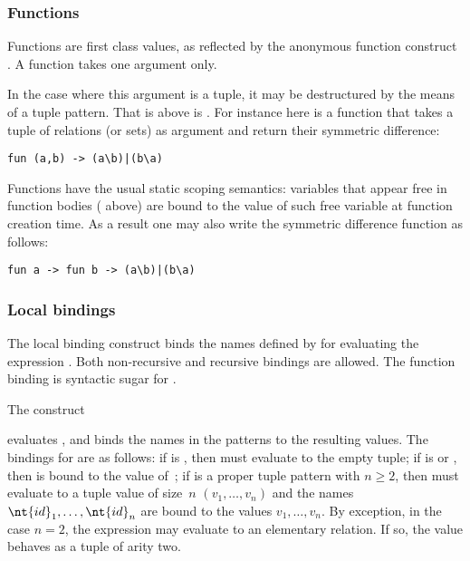 \subsubsection*{Functions}
Functions are first class values, as reflected by the anonymous
function construct .
A function takes one argument only.

In the case where this argument is a tuple, it may be destructured
by the means of a tuple pattern. That is 
above is .
For instance here is a function that takes a tuple of
relations (or sets) as argument and return their symmetric difference:
\begin{verbatim}
fun (a,b) -> (a\b)|(b\a)
\end{verbatim}

Functions have the usual static scoping semantics:
variables that appear free in function bodies
( above) are bound to
the value of such free variable at function creation time.
As a result one may also write the symmetric difference function
as follows:
\begin{verbatim}
fun a -> fun b -> (a\b)|(b\a)
\end{verbatim}

\subsubsection*{\label{bindings}Local bindings}
The local binding construct
binds the names defined by 
for evaluating the expression .
Both non-recursive and recursive bindings are allowed.
The function binding
 is syntactic sugar
for .

The construct
\begin{center}
  
\end{center}
evaluates ,
and binds the names in the patterns
 to the resulting values.
The bindings for  are as follows:
if  is \T{(}\T{)}, then  must evaluate to the empty
tuple;
if  is  or ,
then  is bound to the value of~;
if  is a proper tuple pattern
 with $n \geq 2$,
then  must evaluate to a tuple value of size~$n$
$(v_1,\ldots,v_n)$ and the names $\nt{id}_1,\ldots,\nt{id}_n$ are
bound to the values  $v_1,\ldots,v_n$.
By exception, in the case $n=2$, the expression  may evaluate to
an elementary relation. If so, the value behaves as a tuple of arity two.

